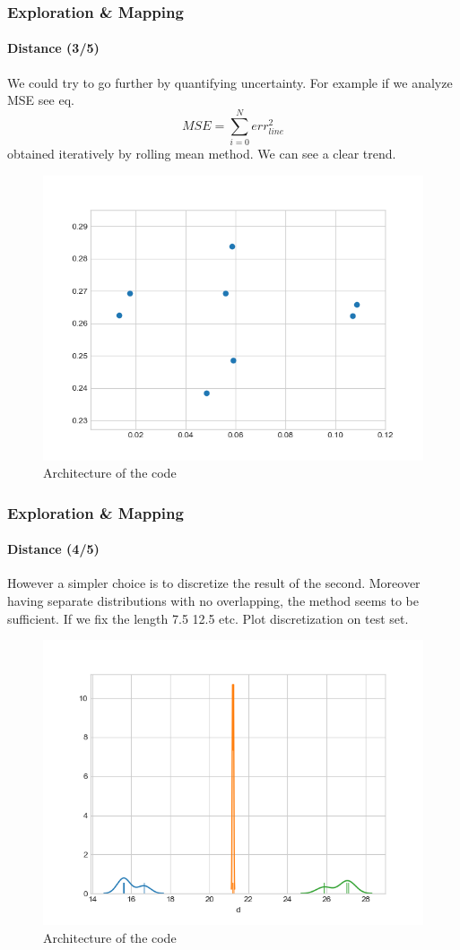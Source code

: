 \documentclass[10pt]{beamer}
\begin{document}

\begin{frame}
\frametitle{Exploration \& Mapping}
\framesubtitle{Distance (3/5)}
We could try to go further by quantifying uncertainty. For example if we analyze MSE see eq.
$$
	MSE = \sum_{i=0}^N err_{line}^2
$$
obtained iteratively by rolling mean method. We can see a clear trend.
\begin{figure}[hbtp]
\centering
\label{fig:architecture}
\includegraphics[scale=0.45]{figures/err-mse.png}
\caption{Architecture of the code}
\end{figure}
\end{frame}


\begin{frame}
\frametitle{Exploration \& Mapping}
\framesubtitle{Distance (4/5)}
However a simpler choice is to discretize the result of the second. Moreover having separate distributions with no overlapping, the method seems to be sufficient.
If we fix the length 7.5 12.5 etc.
Plot discretization on test set.
\begin{figure}[hbtp]
\centering
\label{fig:architecture}
\includegraphics[scale=0.45]{figures/distrib.png}
\caption{Architecture of the code}
\end{figure}
\end{frame}
\end{document}
